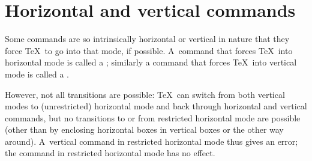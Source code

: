 \documentclass[twoside,letterpaper,openright]{rapport3}
\begin{document}
\section{Horizontal and vertical commands}

Some commands are so intrinsically horizontal or vertical
in nature that they force \TeX\ to go into that mode, if
possible. A~command that forces \TeX\ into horizontal mode
is called a ; similarly a command that
forces \TeX\ into vertical mode is called a
.

However, not all transitions are possible:
\TeX\ can switch from both vertical modes to 
(unrestricted) horizontal mode and back
through horizontal and vertical commands, but no transitions
to or from restricted horizontal mode are possible
(other than by enclosing horizontal boxes in vertical boxes or
the other way around).
A~vertical command in restricted horizontal mode thus gives
an error; the  command in restricted horizontal mode
has no effect.
\end{document}
